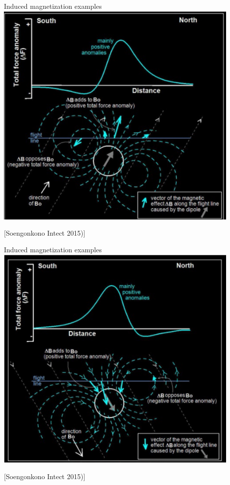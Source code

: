 \begin{frame}
    \begin{PointSix}{Induced magnetization examples}
      \includegraphics[width=0.9\textwidth]{Figures/Magnetics/AnomalySouthernHemisphere.png}

      [Soengonkono Intect 2015)]
    \end{PointSix}
\end{frame}

\begin{frame}
    \begin{PointSix}{Induced magnetization examples}
      \includegraphics[width=0.9\textwidth]{Figures/Magnetics/AnomalyNothernHemisphere.png}

      [Soengonkono Intect 2015)]
    \end{PointSix}
\end{frame}

